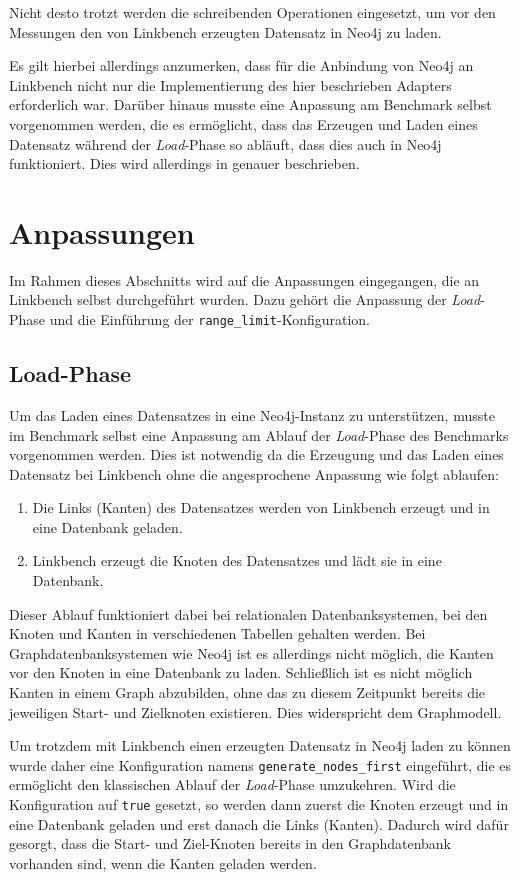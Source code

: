 Nicht desto trotzt werden die schreibenden Operationen eingesetzt, um vor den Messungen den von Linkbench erzeugten Datensatz in Neo4j zu laden.

Es gilt hierbei allerdings anzumerken, dass für die Anbindung von Neo4j an Linkbench nicht nur die Implementierung des hier beschrieben Adapters erforderlich war. Darüber hinaus musste eine Anpassung am Benchmark selbst vorgenommen werden, die es ermöglicht, dass das Erzeugen und Laden eines Datensatz während der \textit{Load}-Phase so abläuft, dass dies auch in Neo4j funktioniert. Dies wird allerdings in  genauer beschrieben.

\section{Anpassungen}
Im Rahmen dieses Abschnitts wird auf die Anpassungen eingegangen, die an Linkbench selbst durchgeführt wurden. Dazu gehört die Anpassung der \textit{Load}-Phase und die Einführung der \texttt{range\_limit}-Konfiguration.

\subsection{Load-Phase}
Um das Laden eines Datensatzes in eine Neo4j-Instanz zu unterstützen, musste im  Benchmark selbst eine Anpassung am Ablauf der \textit{Load}-Phase des Benchmarks vorgenommen werden. Dies ist notwendig da die Erzeugung und das Laden eines Datensatz bei Linkbench ohne die angesprochene Anpassung wie folgt ablaufen:
\begin{enumerate}
    \item Die Links (Kanten) des Datensatzes werden von Linkbench erzeugt und in eine Datenbank geladen. 
    \item Linkbench erzeugt die Knoten des Datensatzes und lädt sie in eine Datenbank. 
\end{enumerate}
Dieser Ablauf funktioniert dabei bei relationalen Datenbanksystemen, bei den Knoten und Kanten in verschiedenen Tabellen gehalten werden. Bei Graphdatenbanksystemen wie Neo4j ist es allerdings nicht möglich, die Kanten vor den Knoten in eine Datenbank zu laden. Schließlich ist es nicht möglich Kanten in einem Graph abzubilden, ohne das zu diesem Zeitpunkt bereits die jeweiligen Start- und Zielknoten existieren. Dies widerspricht dem Graphmodell.

Um trotzdem mit Linkbench einen erzeugten Datensatz in Neo4j laden zu können wurde daher eine Konfiguration namens \texttt{generate\_nodes\_first} eingeführt, die es ermöglicht den klassischen Ablauf der \textit{Load}-Phase umzukehren. Wird die Konfiguration auf \texttt{true} gesetzt, so werden dann zuerst die Knoten erzeugt und in eine Datenbank geladen und erst danach die Links (Kanten). Dadurch wird dafür gesorgt, dass die Start- und Ziel-Knoten bereits in den Graphdatenbank vorhanden sind, wenn die Kanten geladen werden. 

